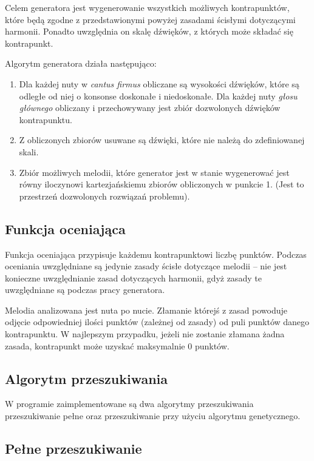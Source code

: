 \documentclass{article}
\begin{document}
Celem generatora jest wygenerowanie wszystkich możliwych kontrapunktów, które będą zgodne z przedstawionymi powyżej zasadami ścisłymi dotyczącymi harmonii.
Ponadto uwzględnia on skalę dźwięków, z których może składać się kontrapunkt.

Algorytm generatora działa następująco:
\begin{enumerate}
\item Dla każdej nuty w \emph{cantus firmus} obliczane są wysokości dźwięków, które są odległe od niej o konsonse doskonałe i niedoskonałe. Dla każdej nuty \emph{głosu głównego} obliczany i przechowywany jest zbiór dozwolonych dźwięków kontrapunktu.
\item Z obliczonych zbiorów usuwane są dźwięki, które nie należą do zdefiniowanej skali.
\item Zbiór możliwych melodii, które generator jest w stanie wygenerować jest równy iloczynowi kartezjańskiemu zbiorów obliczonych w punkcie 1. (Jest to przestrzeń dozwolonych rozwiązań problemu).
\end{enumerate}

\subsection{Funkcja oceniająca}

Funkcja oceniająca przypisuje każdemu kontrapunktowi liczbę punktów. Podczas oceniania uwzględniane są jedynie zasady ścisłe dotyczące melodii -- nie jest konieczne uwzględnianie zasad dotyczących harmonii, gdyż zasady te uwzględniane są podczas pracy generatora.

Melodia analizowana jest nuta po nucie. Złamanie którejś z zasad powoduje odjęcie odpowiedniej ilości punktów (zależnej od zasady) od puli punktów danego kontrapunktu. W najlepszym przypadku, jeżeli nie zostanie złamana żadna zasada, kontrapunkt może uzyskać maksymalnie $0$ punktów.

\subsection{Algorytm przeszukiwania}

W programie zaimplementowane są dwa algorytmy przeszukiwania przeszukiwanie pełne oraz przeszukiwanie przy użyciu algorytmu genetycznego.

\subsection{Pełne przeszukiwanie}
\end{document}
